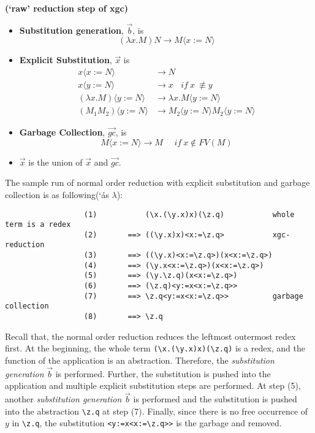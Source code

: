 \begin{def1}
\normalfont \textbf{(`raw' reduction step of xgc)}
\end{def1}

\begin{itemize}
\item \textbf{Substitution generation}, $\overrightarrow{b}$, is 
\begin{equation}
\tag{b}
(\lambda x.M)N \rightarrow M\langle x:=N\rangle
\end{equation}
\item \textbf{Explicit Substitution}, $\overrightarrow{x}$ is
\begin{align*} 
\tag{xv} x\langle x:=N\rangle & \rightarrow N \\
\tag{xvgc} x\langle y:=N\rangle & \rightarrow x \ \ \ \ if\ x\ \not\equiv y \\
\tag{xab} (\lambda x.M)\langle y:=N\rangle & \rightarrow \lambda x.M\langle y:=N\rangle \\
\tag{xap} (M_1M_2)\langle y:=N\rangle & \rightarrow M_2\langle y:=N\rangle M_2\langle y:=N\rangle
\end{align*}
\item \textbf{Garbage Collection}, $\overrightarrow{gc}$, is
\begin{equation}
\tag{gc}
M\langle x:=N\rangle \rightarrow M\ \ \ \ \ \ if\ x\notin FV(M)
\end{equation}
\item $\overrightarrow{x}$ is the union of $\overrightarrow{x}$ and $\overrightarrow{gc}$.
\end{itemize}


\begin{exmp}
\normalfont The sample run of normal order reduction with explicit substitution and garbage collection is as following(`\' as $\lambda$):
\end{exmp}
\begin{verbatim}
                  (1)           (\x.(\y.x)x)(\z.q)           whole term is a redex
                  (2)       ==> ((\y.x)x)<x:=\z.q>           xgc-reduction
                  (3)       ==> ((\y.x)<x:=\z.q>)(x<x:=\z.q>)
                  (4)       ==> (\y.x<x:=\z.q>)(x<x:=\z.q>)
                  (5)       ==> (\y.\z.q)(x<x:=\z.q>)
                  (6)       ==> (\z.q)<y:=x<x:=\z.q>>
                  (7)       ==> \z.q<y:=x<x:=\z.q>>          garbage collection
                  (8)       ==> \z.q
\end{verbatim}

Recall that, the normal order reduction reduces the leftmost outermost redex first. At the beginning, the whole term \verb|(\x.(\y.x)x)(\z.q)| is a redex, and the function of the application is an abstraction. Therefore, the \textit{substitution generation} $\overrightarrow{b}$ is performed. Further, the substitution is pushed into the application and multiple explicit substitution steps are performed. At step (5), another \textit{substitution generation} $\overrightarrow{b}$ is performed and the substitution is pushed into the abstraction \verb|\z.q| at step (7). Finally, since there is no free occurrence of $y$ in \verb|\z.q|, the substitution \verb|<y:=x<x:=\z.q>>| is the garbage and removed.

